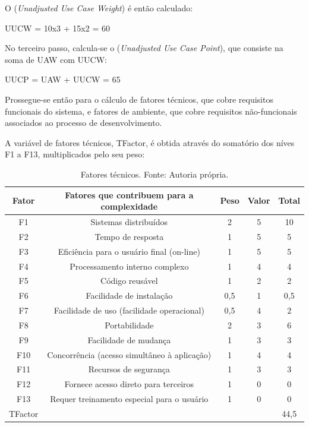 O  (\textit{Unadjusted Use Case Weight}) é então calculado:

\begin{center}
UUCW = 10x3 + 15x2 = 60
\end{center}

No terceiro passo, calcula-se o  (\textit{Unadjusted Use Case Point}), que consiste na soma de UAW com UUCW:

\begin{center}
UUCP = UAW + UUCW = 65
\end{center}

Prossegue-se então para o cálculo de fatores técnicos, que cobre requisitos funcionais do sistema, e fatores de ambiente, que cobre requisitos não-funcionais associados ao processo de desenvolvimento.

A variável de fatores técnicos, TFactor, é obtida através do somatório dos níves F1 a F13, multiplicados pelo seu peso:

\begin{table}[h!]
\caption[Fatores técnicos]{Fatores técnicos. Fonte: Autoria própria.}
\begin{center}
\begin{tabular}{|c|c|c|c|c|}
\hline
\textbf{Fator} & \textbf{Fatores que contribuem para a complexidade} & \textbf{Peso} & \textbf{Valor}  & \textbf{Total} \\ \hline \hline
F1  & Sistemas distribuídos & 2 & 5 & 10	\\
\hline
F2  & Tempo de resposta & 1 & 5 & 5	\\
\hline
F3  & Eficiência para o usuário final (on-line) & 1 & 5 & 5	\\
\hline
F4  & Processamento interno complexo & 1 & 4 & 4	\\
\hline
F5  & Código reusável & 1 & 2 & 2	\\
\hline
F6  & Facilidade de instalação & 0,5 & 1 & 0,5	\\
\hline
F7  & Facilidade de uso (facilidade operacional) & 0,5 & 4 & 2	\\
\hline
F8  & Portabilidade & 2 & 3 & 6	\\
\hline
F9  & Facilidade de mudança & 1 & 3 & 3	\\
\hline
F10  & Concorrência (acesso simultâneo à aplicação) & 1 & 4 & 4	\\
\hline
F11  & Recursos de segurança & 1 & 3 & 3	\\
\hline
F12  & Fornece acesso direto para terceiros & 1 & 0 & 0	\\
\hline
F13  & Requer treinamento especial para o usuário & 1 & 0 & 0	\\
\hline
TFactor & & & & 44,5	\\
\hline
\end{tabular}%
\end{center}
\label{tab:tfactor}
\end{table}

